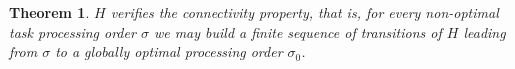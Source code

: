 \documentclass[letterpaper]{article}
\newtheorem{theorem}{Theorem}
\begin{document}
\begin{theorem}\label{thConnectivityH2}
$H$ verifies the connectivity property, that is, for every non-optimal task processing order $\sigma$ we may build a finite sequence of transitions of $H$ leading from $\sigma$ to a globally optimal processing order $\sigma_0$.
\end{theorem}
%
\end{document}
